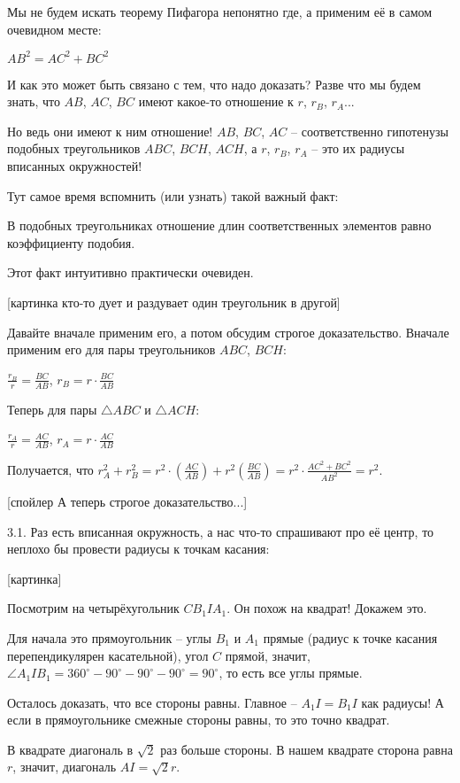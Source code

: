 Мы не будем искать теорему Пифагора непонятно где, а применим её в самом очевидном месте:

$AB^2 = AC^2 + BC^2$

И как это может быть связано с тем, что надо доказать? Разве что мы будем знать, что $AB$, $AC$, $BC$ имеют какое-то отношение к $r$, $r_B$, $r_A$...

Но ведь они имеют к ним отношение! 
$AB$, $BC$, $AC$ -- соответственно гипотенузы подобных треугольников $ABC$, $BCH$, $ACH$, а $r$, $r_B$, $r_A$ -- это их радиусы вписанных окружностей!

Тут самое время вспомнить (или узнать) такой важный факт:

В подобных треугольниках отношение длин соответственных элементов равно коэффициенту подобия.

Этот факт интуитивно практически очевиден.

[картинка кто-то дует и раздувает один треугольник в другой]

Давайте вначале применим его, а потом обсудим строгое доказательство.
Вначале применим его для пары треугольников $ABC$, $BCH$:

$\frac{r_B}{r} = \frac{BC}{AB}$, $r_B = r \cdot \frac{BC}{AB}$

Теперь для пары $\triangle ABC$ и $\triangle ACH$:

$\frac{r_A}{r} = \frac{AC}{AB}$, $r_A = r \cdot \frac{AC}{AB}$

Получается, что 
$r_A^2 + r_B^2 = r^2 \cdot  \left(\frac{AC}{AB}\right) + r^2 \left(\frac{BC}{AB}\right) = r^2 \cdot \frac{AC^2 + BC^2}{AB^2} = r^2$.

[спойлер А теперь строгое доказательство...] 

3.1. Раз есть вписанная окружность, а нас что-то спрашивают про её центр, то неплохо бы провести радиусы к точкам касания:

[картинка]

Посмотрим на четырёхугольник $C B_1 I A_1$. Он похож на квадрат! Докажем это.

Для начала это прямоугольник -- углы $B_1$ и $A_1$ прямые (радиус к точке касания перепендикулярен касательной), угол $C$ прямой, значит, $\angle A_1 I B_1 = 360^\circ - 90^\circ - 90^\circ - 90^\circ = 90^\circ$, то есть все углы прямые.

Осталось доказать, что все стороны равны. Главное -- $A_1I = B_1I$ как радиусы! А если в прямоугольнике смежные стороны равны, то это точно квадрат.

В квадрате диагональ в $\sqrt{2}$ раз больше стороны. В нашем квадрате сторона равна $r$, значит, диагональ $AI = \sqrt{2}r$.

